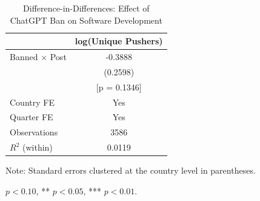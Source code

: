 \begin{table}[htbp]
\centering
\caption{Difference-in-Differences: Effect of ChatGPT Ban on Software Development}
\label{tab:main_did}
\begin{tabular}{lc}
\toprule
 & log(Unique Pushers) \\
\midrule
Banned $\times$ Post & -0.3888 \\
 & (0.2598) \\
 & [p = 0.1346] \\
\midrule
Country FE & Yes \\
Quarter FE & Yes \\
Observations & 3586 \\
$R^2$ (within) & 0.0119 \\
\bottomrule
\end{tabular}
\begin{tablenotes}
\small
\item Note: Standard errors clustered at the country level in parentheses.
\item * $p<0.10$, ** $p<0.05$, *** $p<0.01$.
\end{tablenotes}
\end{table}